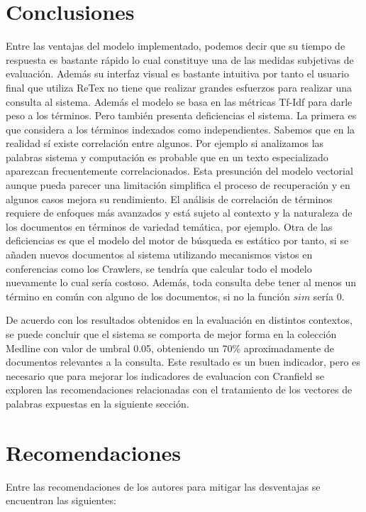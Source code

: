 \section{Conclusiones}

Entre las ventajas del modelo implementado, podemos decir que su tiempo de respuesta es bastante rápido lo cual constituye una de las medidas subjetivas de evaluación. Además su interfaz visual es bastante intuitiva por tanto el usuario final que utiliza ReTex no tiene que realizar grandes esfuerzos para realizar una consulta al sistema. Además el modelo se basa en las métricas Tf-Idf para darle peso a los términos. Pero también presenta deficiencias el sistema. La primera es que considera a los términos indexados como independientes. Sabemos que en la realidad sí existe correlación entre  algunos. Por ejemplo si analizamos las palabras sistema y computación es probable que en un texto especializado aparezcan frecuentemente correlacionados. Esta presunción del modelo vectorial aunque pueda parecer una  limitación simplifica el proceso de recuperación y en algunos casos mejora su rendimiento. El análisis de correlación de términos requiere de enfoques más avanzados y está sujeto al contexto y la naturaleza de los documentos en términos de variedad temática, por ejemplo. Otra de las deficiencias es que el modelo del motor de búsqueda es estático por tanto, si se añaden nuevos documentos al sistema utilizando mecanismos vistos en conferencias como los Crawlers, se tendría que calcular todo el modelo nuevamente lo cual sería costoso. Además, toda consulta debe tener al menos un término en común con alguno de los documentos, si no la función $sim$ sería 0.

De acuerdo con los resultados obtenidos en la evaluación en distintos contextos, se puede concluir que el sistema se comporta de mejor forma en la colección Medline con valor de umbral 0.05, obteniendo un 70\% aproximadamente de documentos relevantes a la consulta. Este resultado es un buen indicador, pero es necesario que para mejorar los indicadores de evaluacion con Cranfield se exploren las recomendaciones relacionadas con el tratamiento de los vectores de palabras expuestas en la siguiente sección.

\section{Recomendaciones}

Entre las recomendaciones de los autores para mitigar las desventajas se encuentran las siguientes:

